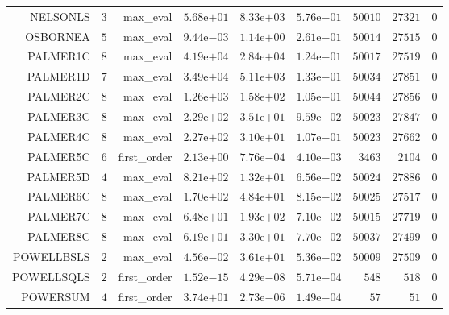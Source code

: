 \begin{longtable}{rrrrrrrrr}
NELSONLS & \(     3\) & max\_eval & \( 5.68\)e\(+01\) & \( 8.33\)e\(+03\) & \( 5.76\)e\(-01\) & \( 50010\) & \( 27321\) & \(     0\) \\
OSBORNEA & \(     5\) & max\_eval & \( 9.44\)e\(-03\) & \( 1.14\)e\(+00\) & \( 2.61\)e\(-01\) & \( 50014\) & \( 27515\) & \(     0\) \\
PALMER1C & \(     8\) & max\_eval & \( 4.19\)e\(+04\) & \( 2.84\)e\(+04\) & \( 1.24\)e\(-01\) & \( 50017\) & \( 27519\) & \(     0\) \\
PALMER1D & \(     7\) & max\_eval & \( 3.49\)e\(+04\) & \( 5.11\)e\(+03\) & \( 1.33\)e\(-01\) & \( 50034\) & \( 27851\) & \(     0\) \\
PALMER2C & \(     8\) & max\_eval & \( 1.26\)e\(+03\) & \( 1.58\)e\(+02\) & \( 1.05\)e\(-01\) & \( 50044\) & \( 27856\) & \(     0\) \\
PALMER3C & \(     8\) & max\_eval & \( 2.29\)e\(+02\) & \( 3.51\)e\(+01\) & \( 9.59\)e\(-02\) & \( 50023\) & \( 27847\) & \(     0\) \\
PALMER4C & \(     8\) & max\_eval & \( 2.27\)e\(+02\) & \( 3.10\)e\(+01\) & \( 1.07\)e\(-01\) & \( 50023\) & \( 27662\) & \(     0\) \\
PALMER5C & \(     6\) & first\_order & \( 2.13\)e\(+00\) & \( 7.76\)e\(-04\) & \( 4.10\)e\(-03\) & \(  3463\) & \(  2104\) & \(     0\) \\
PALMER5D & \(     4\) & max\_eval & \( 8.21\)e\(+02\) & \( 1.32\)e\(+01\) & \( 6.56\)e\(-02\) & \( 50024\) & \( 27886\) & \(     0\) \\
PALMER6C & \(     8\) & max\_eval & \( 1.70\)e\(+02\) & \( 4.84\)e\(+01\) & \( 8.15\)e\(-02\) & \( 50025\) & \( 27517\) & \(     0\) \\
PALMER7C & \(     8\) & max\_eval & \( 6.48\)e\(+01\) & \( 1.93\)e\(+02\) & \( 7.10\)e\(-02\) & \( 50015\) & \( 27719\) & \(     0\) \\
PALMER8C & \(     8\) & max\_eval & \( 6.19\)e\(+01\) & \( 3.30\)e\(+01\) & \( 7.70\)e\(-02\) & \( 50037\) & \( 27499\) & \(     0\) \\
POWELLBSLS & \(     2\) & max\_eval & \( 4.56\)e\(-02\) & \( 3.61\)e\(+01\) & \( 5.36\)e\(-02\) & \( 50009\) & \( 27509\) & \(     0\) \\
POWELLSQLS & \(     2\) & first\_order & \( 1.52\)e\(-15\) & \( 4.29\)e\(-08\) & \( 5.71\)e\(-04\) & \(   548\) & \(   518\) & \(     0\) \\
POWERSUM & \(     4\) & first\_order & \( 3.74\)e\(+01\) & \( 2.73\)e\(-06\) & \( 1.49\)e\(-04\) & \(    57\) & \(    51\) & \(     0\) \\

\end{longtable}
